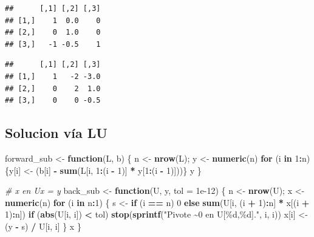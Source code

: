 \documentclass[
]{book}
\newenvironment{Shaded}{\begin{snugshade}}{\end{snugshade}}
\newcommand{\AttributeTok}[1]{\textcolor[rgb]{0.13,0.29,0.53}{#1}}
\newcommand{\CommentTok}[1]{\textcolor[rgb]{0.56,0.35,0.01}{\textit{#1}}}
\newcommand{\ControlFlowTok}[1]{\textcolor[rgb]{0.13,0.29,0.53}{\textbf{#1}}}
\newcommand{\DecValTok}[1]{\textcolor[rgb]{0.00,0.00,0.81}{#1}}
\newcommand{\FloatTok}[1]{\textcolor[rgb]{0.00,0.00,0.81}{#1}}
\newcommand{\FunctionTok}[1]{\textcolor[rgb]{0.13,0.29,0.53}{\textbf{#1}}}
\newcommand{\NormalTok}[1]{#1}
\newcommand{\OtherTok}[1]{\textcolor[rgb]{0.56,0.35,0.01}{#1}}
\newcommand{\SpecialCharTok}[1]{\textcolor[rgb]{0.81,0.36,0.00}{\textbf{#1}}}
\newcommand{\StringTok}[1]{\textcolor[rgb]{0.31,0.60,0.02}{#1}}
\begin{document}
\begin{verbatim}
##      [,1] [,2] [,3]
## [1,]    1  0.0    0
## [2,]    0  1.0    0
## [3,]   -1 -0.5    1
\end{verbatim}

\begin{verbatim}
##      [,1] [,2] [,3]
## [1,]    1   -2 -3.0
## [2,]    0    2  1.0
## [3,]    0    0 -0.5
\end{verbatim}

\subsection{Solucion vía LU}\label{solucion-vuxeda-lu}

\begin{Shaded}
\begin{Highlighting}[]
\NormalTok{forward\_sub }\OtherTok{\textless{}{-}} \ControlFlowTok{function}\NormalTok{(L, b) \{}
\NormalTok{  n }\OtherTok{\textless{}{-}} \FunctionTok{nrow}\NormalTok{(L);  y }\OtherTok{\textless{}{-}} \FunctionTok{numeric}\NormalTok{(n)}
  \ControlFlowTok{for}\NormalTok{ (i }\ControlFlowTok{in} \DecValTok{1}\SpecialCharTok{:}\NormalTok{n) \{y[i] }\OtherTok{\textless{}{-}}\NormalTok{ (b[i] }\SpecialCharTok{{-}} \FunctionTok{sum}\NormalTok{(L[i, }\DecValTok{1}\SpecialCharTok{:}\NormalTok{(i }\SpecialCharTok{{-}} \DecValTok{1}\NormalTok{)] }\SpecialCharTok{*}\NormalTok{ y[}\DecValTok{1}\SpecialCharTok{:}\NormalTok{(i }\SpecialCharTok{{-}} \DecValTok{1}\NormalTok{)]))\}}
\NormalTok{  y}
\NormalTok{\}}
\end{Highlighting}
\end{Shaded}

\begin{Shaded}
\begin{Highlighting}[]
\CommentTok{\# x en Ux = y}
\NormalTok{back\_sub }\OtherTok{\textless{}{-}} \ControlFlowTok{function}\NormalTok{(U, y, }\AttributeTok{tol =} \FloatTok{1e{-}12}\NormalTok{) \{}
\NormalTok{  n }\OtherTok{\textless{}{-}} \FunctionTok{nrow}\NormalTok{(U);  x }\OtherTok{\textless{}{-}} \FunctionTok{numeric}\NormalTok{(n)}
  \ControlFlowTok{for}\NormalTok{ (i }\ControlFlowTok{in}\NormalTok{ n}\SpecialCharTok{:}\DecValTok{1}\NormalTok{) \{}
\NormalTok{    s }\OtherTok{\textless{}{-}} \ControlFlowTok{if}\NormalTok{ (i }\SpecialCharTok{==}\NormalTok{ n) }\DecValTok{0} \ControlFlowTok{else} \FunctionTok{sum}\NormalTok{(U[i, (i }\SpecialCharTok{+} \DecValTok{1}\NormalTok{)}\SpecialCharTok{:}\NormalTok{n] }\SpecialCharTok{*}\NormalTok{ x[(i }\SpecialCharTok{+} \DecValTok{1}\NormalTok{)}\SpecialCharTok{:}\NormalTok{n])}
    \ControlFlowTok{if}\NormalTok{ (}\FunctionTok{abs}\NormalTok{(U[i, i]) }\SpecialCharTok{\textless{}}\NormalTok{ tol) }\FunctionTok{stop}\NormalTok{(}\FunctionTok{sprintf}\NormalTok{(}\StringTok{"Pivote \textasciitilde{}0 en U[\%d,\%d]."}\NormalTok{, i, i))}
\NormalTok{    x[i] }\OtherTok{\textless{}{-}}\NormalTok{ (y }\SpecialCharTok{{-}}\NormalTok{ s) }\SpecialCharTok{/}\NormalTok{ U[i, i]}
\NormalTok{  \}}
\NormalTok{  x}
\NormalTok{\}}
\end{Highlighting}
\end{Shaded}
\end{document}
